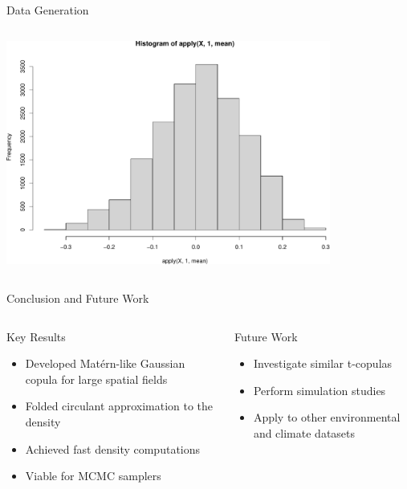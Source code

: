 \documentclass[
  ignorenonframetext,
]{beamer}
\providecommand{\tightlist}{%
  \setlength{\itemsep}{0pt}\setlength{\parskip}{0pt}}\usepackage{longtable,booktabs,array}
\begin{document}
\begin{frame}[fragile]{Data Generation}
\begin{columns}[T]
\begin{column}{0.5\textwidth}
\includegraphics[width=0.8\textwidth,height=\textheight]{index_files/figure-beamer/unnamed-chunk-10-1.pdf}
\end{column}
\end{columns}
\end{frame}

\begin{frame}{Conclusion and Future Work}
\label{conclusion-and-future-work}
\begin{columns}[T]
\begin{column}{0.5\textwidth}
\begin{block}{Key Results}
\label{key-results}
\begin{itemize}
\tightlist
\item
  Developed Matérn-like Gaussian copula for large spatial fields
\item
  Folded circulant approximation to the density
\item
  Achieved fast density computations
\item
  Viable for MCMC samplers
\end{itemize}
\end{block}
\end{column}

\begin{column}{0.5\textwidth}
\begin{block}{Future Work}
\label{future-work}
\begin{itemize}
\tightlist
\item
  Investigate similar t-copulas
\item
  Perform simulation studies
\item
  Apply to other environmental and climate datasets
\end{itemize}
\end{block}
\end{column}
\end{columns}
\end{frame}
\end{document}
